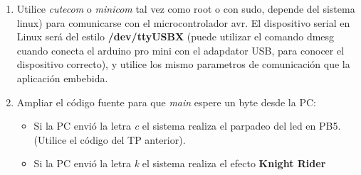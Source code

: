 \begin{enumerate}
      \item Utilice \textit{cutecom} o \textit{minicom} tal vez como root o con sudo, depende del sistema linux) para comunicarse con el microcontrolador avr. El dispositivo serial en Linux será del estilo \textbf{/dev/ttyUSBX} (puede utilizar el comando dmesg cuando conecta el arduino pro mini con el adapdator USB, para conocer el dispositivo correcto), y utilice los mismo parametros de comunicación que la aplicación embebida.

      \item Ampliar el código fuente para que \textit{main} espere un byte desde la PC:

            \begin{itemize}
                  \item Si la PC envió la letra \textit{c} el sistema realiza el parpadeo del led en PB5. (Utilice el código del TP anterior).
                  \item Si la PC envió la letra \textit{k} el sistema realiza el efecto \textbf{Knight Rider}
            \end{itemize}
\end{enumerate}